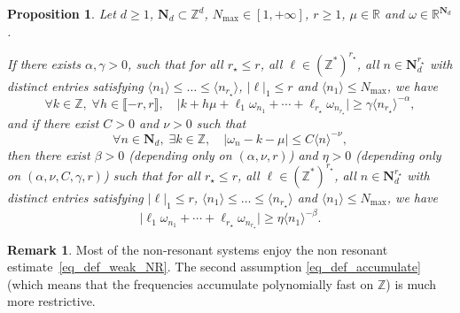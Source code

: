 \documentclass[JEP,XML,SOM,Unicode,NoEqCountersInSection,published]{cedram}
\newtheorem{proposition}[theorem]{Proposition}
\theoremstyle{definition}
\newtheorem{remark}[theorem]{Remark}
\begin{document}
\begin{proposition} \label{prop_weak_become_strong} Let $d\geq 1$, $\mathbf{N}_d \subset \mathbb{Z}^d$, $N_{\max} \in [1,+\infty]$, $r\geq 1$, $\mu \in \mathbb{R}$ and $\omega \in \mathbb{R}^{\mathbf{N}_d}$.

If there exists $\alpha,\gamma>0$, such that for all $r_\star \leq r$, all $\ell \in (\mathbb{Z}^*)^{r_\star}$, all $n \in \mathbf{N}_d^{r_\star}$ with distinct entries satisfying $\langle n_1 \rangle \leq \dots \leq \langle n_{r_\star} \rangle$, $|\ell|_1 \leq r$ and $\langle n_1 \rangle \leq N_{\max}$, we have
\begin{equation}
\label{eq_def_weak_NR}
\forall k \in \mathbb{Z},\;\forall h\in \llbracket -r,r \rrbracket, \quad
\big| k + h\mu+\ell_1 \omega_{n_1}+\cdots +\ell_{r_\star} \omega_{n_{r_\star}} \big| \geq \gamma \langle n_{r_\star} \rangle^{-\alpha},
\end{equation}
and if there exist $C>0$ and $\nu >0$ such that
\begin{equation}
\label{eq_def_accumulate}
\forall n \in \mathbf{N}_d,\; \exists k \in \mathbb{Z}, \quad |\omega_n - k - \mu | \leq C \langle n \rangle^{-\nu},
\end{equation}
then there exist $\beta>0$ (depending only on $(\alpha,\nu,r)$) and $\eta >0$ (depending only on $(\alpha,\nu,C,\gamma,r)$) such that for all $r_\star \leq r$, all $\ell \in (\mathbb{Z}^*)^{r_\star}$, all $n \in \mathbf{N}_d^{r_\star}$ with distinct entries satisfying $|\ell|_1 \leq r$, $\langle n_1 \rangle \leq \dots \leq \langle n_{r_\star} \rangle$ and $\langle n_1 \rangle \leq N_{\max}$, we have
\begin{equation}
\label{eq_def_strong_NR}
\big| \ell_1 \omega_{n_1}+\cdots +\ell_{r_\star} \omega_{n_{r_\star}} \big| \geq \eta \langle n_{1} \rangle^{-\beta}.
\end{equation}
\end{proposition}
\begin{remark} Most of the non-resonant systems enjoy the non resonant estimate~\eqref{eq_def_weak_NR}. The second assumption \eqref{eq_def_accumulate} (which means that the frequencies accumulate polynomially fast on $ \mathbb{Z}$) is much more restrictive.
\end{remark}
\end{document}
